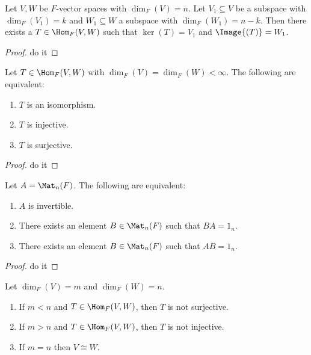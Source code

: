     \begin{corollary}
        Let $V,W$ be $F$-vector spaces with $\dim_F{(V)} = n$. Let $V_1 \subseteq V$ be a subspace with $\dim_F{(V_1)} = k$ and $W_1 \subseteq W$ a subspace with $\dim_F{(W_1)} = n-k$. Then there exists a $T \in \Hom_F{(V,W)}$ such that $\ker{(T)} = V_1$ and $\Image{(T)} = W_1$.
    \end{corollary}
        \begin{proof}
            \color{red} do it
        \end{proof}

    \begin{corollary}
        Let $T \in \Hom_F{(V,W)}$ with $\dim_F{(V)} = \dim_F{(W)} < \infty$. The following are equivalent:
            \begin{enumerate}[label = (\arabic*)]
                \item $T$ is an isomorphism.
                \item $T$ is injective.
                \item $T$ is surjective.
            \end{enumerate}
    \end{corollary}
        \begin{proof}
            \color{red} do it
        \end{proof}
    
    \begin{corollary}
        Let $A = \Mat_n{(F)}$. The following are equivalent:
            \begin{enumerate}[label = (\arabic*)]
                \item $A$ is invertible.
                \item There exists an element $B \in \Mat_n{(F)}$ such that $BA = 1_n$.
                \item There exists an element $B \in \Mat_n{(F)}$ such that $AB = 1_n$.
            \end{enumerate}
    \end{corollary}
        \begin{proof}
            \color{red} do it
        \end{proof}

    \begin{corollary}
        Let $\dim_F{(V)} = m$ and $\dim_F{(W)} = n$.
            \begin{enumerate}[label = (\arabic*)]
                \item If $m <n$ and $T \in \Hom_F{(V,W)}$, then $T$ is not surjective.
                \item If $m > n$ and $T \in \Hom_F{(V,W)}$, then $T$ is not injective.
                \item If $m=n$ then $V \cong W$.
            \end{enumerate}
    \end{corollary}

